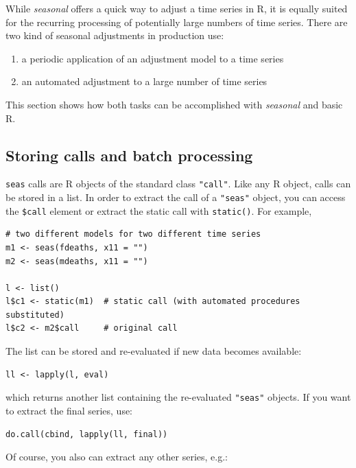 While \emph{seasonal} offers a quick way to adjust a time series in R,
it is equally suited for the recurring processing of potentially large
numbers of time series. There are two kind of seasonal adjustments in
production use:

\begin{enumerate}
\def\labelenumi{\arabic{enumi}.}
\itemsep1pt\parskip0pt
\item
  a periodic application of an adjustment model to a time series
\item
  an automated adjustment to a large number of time series
\end{enumerate}

This section shows how both tasks can be accomplished with
\emph{seasonal} and basic R.

\subsection{Storing calls and batch
processing}\label{storing-calls-and-batch-processing}

\texttt{seas} calls are R objects of the standard class \texttt{"call"}.
Like any R object, calls can be stored in a list. In order to extract
the call of a \texttt{"seas"} object, you can access the \texttt{\$call}
element or extract the static call with \texttt{static()}. For example,

\begin{verbatim}
# two different models for two different time series
m1 <- seas(fdeaths, x11 = "")
m2 <- seas(mdeaths, x11 = "")

l <- list()
l$c1 <- static(m1)  # static call (with automated procedures substituted)
l$c2 <- m2$call     # original call
\end{verbatim}

The list can be stored and re-evaluated if new data becomes available:

\begin{verbatim}
ll <- lapply(l, eval)
\end{verbatim}

which returns another list containing the re-evaluated \texttt{"seas"}
objects. If you want to extract the final series, use:

\begin{verbatim}
do.call(cbind, lapply(ll, final))
\end{verbatim}

Of course, you also can extract any other series, e.g.:

